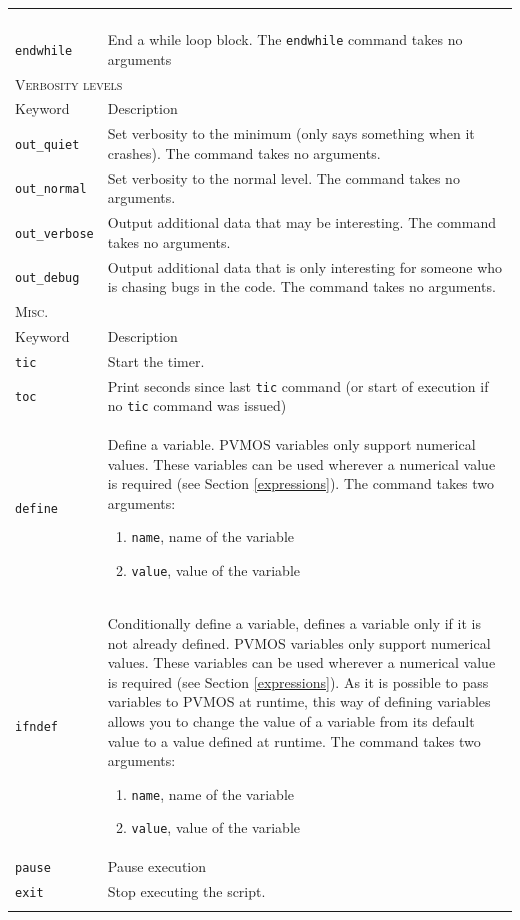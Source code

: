\documentclass[noshowpacs,preprintnumbers,amsmath,amssymb, letter]{revtex4}
\begin{document}
\begin{longtable}{p{}p{}}
\begin{enumerate}
\end{enumerate}\\
\texttt{endwhile}	&  End a while loop block. The \texttt{endwhile} command takes no arguments\\
\multicolumn{2}{l}{\textsc{Verbosity levels}} \\*
\hline
Keyword & Description \\
\texttt{out\_quiet}	&  Set verbosity to the minimum (only says something when it crashes). The command takes no arguments.\\
\texttt{out\_normal}	&  Set verbosity to the normal level. The command takes no arguments.\\
\texttt{out\_verbose}	&  Output additional data that may be interesting. The command takes no arguments.\\
\texttt{out\_debug}	&  Output additional data that is only interesting for someone who is chasing bugs in the code. The command takes no arguments.\\
\multicolumn{2}{l}{\textsc{Misc.}} \\*
\hline
Keyword & Description \\
\texttt{tic}	&  Start the timer.\\
\texttt{toc}	&  Print seconds since last \texttt{tic} command (or start of execution if no \texttt{tic} command was issued)\\
\texttt{define}	&  Define a variable. PVMOS variables only support numerical values. These variables can be used wherever a numerical value is required (see Section \ref{expressions}). The command takes two arguments:
\begin{enumerate}
\item \texttt{name}, name of the variable
\item \texttt{value}, value of the variable
\end{enumerate}\\
\texttt{ifndef}	&  Conditionally define a variable, defines a variable only if it is not already defined. PVMOS variables only support numerical values. These variables can be used wherever a numerical value is required (see Section \ref{expressions}). As it is possible to pass variables to PVMOS at runtime, this way of defining variables allows you to change the value of a variable from its default value to a value defined at runtime. The command takes two arguments:
\begin{enumerate}
\item \texttt{name}, name of the variable
\item \texttt{value}, value of the variable
\end{enumerate}\\
\texttt{pause}	&  Pause execution\\
\texttt{exit}	&  Stop executing the script.\\
\hline
\\
\end{longtable}
\end{document}
